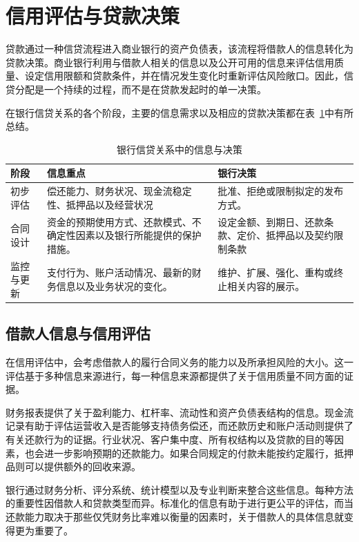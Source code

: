 \section{信用评估与贷款决策}

贷款通过一种信贷流程进入商业银行的资产负债表，该流程将借款人的信息转化为贷款决策。商业银行利用与借款人相关的信息以及公开可用的信息来评估信用质量、设定信用限额和贷款条件，并在情况发生变化时重新评估风险敞口。因此，信贷分配是一个持续的过程，而不是在贷款发起时的单一决策。

在银行信贷关系的各个阶段，主要的信息需求以及相应的贷款决策都在表~\ref{tab:ch12-credit-process}中有所总结。

\begin{table}[H]
\centering
\caption{银行信贷关系中的信息与决策}
\label{tab:ch12-credit-process}
\begin{tabularx}{0.90\textwidth}{@{}p{} X X@{}}
\toprule
\textbf{阶段} & \textbf{信息重点} & \textbf{银行决策} \\
\midrule
初步评估
& 偿还能力、财务状况、现金流稳定性、抵押品以及经营状况
& 批准、拒绝或限制拟定的发布方式。 \\
合同设计
& 资金的预期使用方式、还款模式、不确定性因素以及银行所能提供的保护措施。
& 设定金额、到期日、还款条款、定价、抵押品以及契约限制条款 \\
监控与更新
& 支付行为、账户活动情况、最新的财务信息以及业务状况的变化。
& 维护、扩展、强化、重构或终止相关内容的展示。 \\
\bottomrule
\end{tabularx}
\end{table}

\subsection{借款人信息与信用评估}

在信用评估中，会考虑借款人的履行合同义务的能力以及所承担风险的大小。这一评估基于多种信息来源进行，每一种信息来源都提供了关于信用质量不同方面的证据。

财务报表提供了关于盈利能力、杠杆率、流动性和资产负债表结构的信息。现金流记录有助于评估运营收入是否能够支持债务偿还，而还款历史和账户活动则提供了有关还款行为的证据。行业状况、客户集中度、所有权结构以及贷款的目的等因素，也会进一步影响预期的还款能力。如果合同规定的付款未能按约定履行，抵押品则可以提供额外的回收来源。

银行通过财务分析、评分系统、统计模型以及专业判断来整合这些信息。每种方法的重要性因借款人和贷款类型而异。标准化的信息有助于进行更公平的评估，而当还款能力取决于那些仅凭财务比率难以衡量的因素时，关于借款人的具体信息就变得更为重要了。


